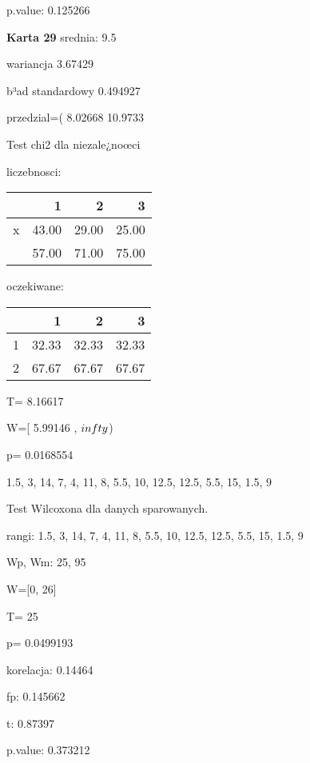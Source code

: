 \documentclass[a4paper,12pt]{article}
\begin{document}
\begin{multicols}{3}
     p.value: 0.125266 \vspace{1cm} 

  \textbf{Karta  29 } 
 srednia: 9.5 
     
     wariancja 3.67429  
     
     b³ad standardowy 0.494927 
     
     przedzial=( 8.02668 10.9733 \vspace{1cm} 

  Test chi2 dla niezale¿noœci 
   
   liczebnosci: %
\begin{tabular}{rrrr}
  \hline
 & 1 & 2 & 3 \\
  \hline
x & 43.00 & 29.00 & 25.00 \\
   & 57.00 & 71.00 & 75.00 \\
   \hline
\end{tabular}
 
   
   oczekiwane: %
\begin{tabular}{rrrr}
  \hline
 & 1 & 2 & 3 \\
  \hline
1 & 32.33 & 32.33 & 32.33 \\
  2 & 67.67 & 67.67 & 67.67 \\
   \hline
\end{tabular}
 
   
   T= 8.16617 
   
   W=[ 5.99146 , $\\infty$) 
   
   p= 0.0168554 \vspace{1cm} 

  1.5, 3, 14, 7, 4, 11, 8, 5.5, 10, 12.5, 12.5, 5.5, 15, 1.5, 9 

  Test Wilcoxona dla danych sparowanych. 
  
  rangi: 1.5, 3, 14, 7, 4, 11, 8, 5.5, 10, 12.5, 12.5, 5.5, 15, 1.5, 9 
  
  Wp, Wm:  25,  95 
  
  W=[0, 26]  
  
  T=  25 
  
  p= 0.0499193 \vspace{1cm} 

  korelacja: 0.14464
     
     fp: 0.145662
     
     t: 0.87397
     
     p.value: 0.373212 \vspace{1cm} 


\end{multicols}
\end{document}
